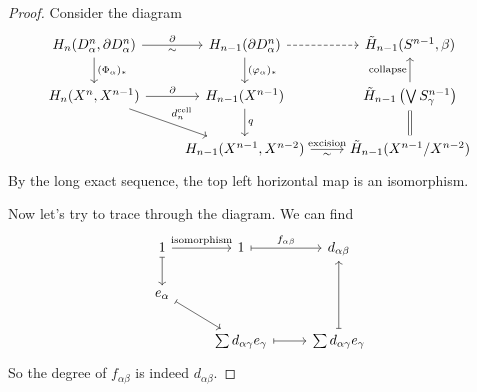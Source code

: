 \documentclass[a4paper]{article}
\theoremstyle{definition}
\begin{document}
\begin{proof}
  Consider the diagram
  \[
    \begin{tikzcd}
      H_n(D_\alpha^n, \partial D_\alpha^n) \ar[d, "(\Phi_\alpha)_*"] \ar[r, "\partial", "\sim"'] & H_{n - 1}(\partial D_\alpha^n)\ar[d, "(\varphi_\alpha)_*"] \ar[r, dashed] & \tilde{H}_{n - 1}(S^{n - 1}, \beta) \\
      H_n(X^n, X^{n - 1}) \ar[r, "\partial"] \ar[rd, "d_n^\mathrm{cell}"] & H_{n - 1}(X^{n - 1}) \ar[d, "q"] & \tilde{H}_{n - 1}\left(\bigvee S_\gamma^{n - 1}\right)\ar[u, "\text{collapse}"]\\
      & H_{n - 1}(X^{n - 1}, X^{n - 2}) \ar[r, "\text{excision}", "\sim"'] & \tilde{H}_{n - 1}(X^{n - 1}/X^{n - 2}) \ar[u, equals]
    \end{tikzcd}
  \]
  By the long exact sequence, the top left horizontal map is an isomorphism.

  Now let's try to trace through the diagram. We can find
  \[
    \begin{tikzcd}
      1 \ar[d, maps to] \ar[r, "\text{isomorphism}"] & 1 \ar[r, maps to, "f_{\alpha\beta}"]& d_{\alpha\beta}\\
      e_\alpha \ar[rd, maps to]\\
      & \sum d_{\alpha\gamma}e_\gamma \ar[r, maps to] & \sum d_{\alpha\gamma} e_\gamma \ar[uu, maps to]
    \end{tikzcd}
  \]
  So the degree of $f_{\alpha\beta}$ is indeed $d_{\alpha\beta}$.
\end{proof}
\end{document}
